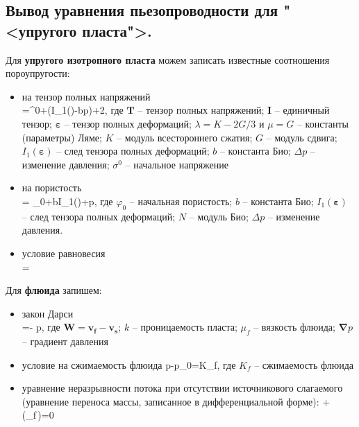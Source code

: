 

\subsection{Вывод уравнения пьезопроводности для "<упругого пласта">.}

Для \textbf{упругого изотропного пласта} можем записать известные соотношения пороупругости:
\begin{itemize}[parsep=-5pt]
\item на тензор полных напряжений \\
\beq
{}=\sigma^0+\left(\lambda I_1(\pmb{\varepsilon})-b\Delta p\right)+2\mu\pmb{\varepsilon},
\eeq
где $\pmb{T}$ -- тензор полных напряжений; $\pmb{I}$ -- единичный тензор; $\pmb{\varepsilon}$ -- тензор полных деформаций; $\lambda=K-2G/3$ и $\mu=G$ -- константы (параметры) Ляме; $K$ -- модуль всестороннего сжатия; $G$ -- модуль сдвига; $I_1(\pmb{\varepsilon})$ -- след тензора полных деформаций; $b$ -- константа Био; $\Delta p$ -- изменение давления; $\sigma^0$ -- начальное напряжение
\item на пористость \\
\beq
\varphi = \varphi_0+bI_1(\pmb{\varepsilon})+\Delta p,
\eeq
где $\varphi_0$ -- начальная пористость; $b$ -- константа Био; $I_1(\pmb{\varepsilon})$ -- след тензора полных деформаций; $N$ -- модуль Био; $\Delta p$ -- изменение давления.
\item условие равновесия \\
\beq
\pmb{\nabla}\cdot{}=
\eeq
\end{itemize}

Для \textbf{флюида} запишем:
\begin{itemize}[parsep=-5pt]
	\item закон Дарси \\
	\beq
	=-\cdot\pmb{\nabla} p,
	\eeq
	где $\pmb{W}=\pmb{v_f}-\pmb{v_s}$; $k$ -- проницаемость пласта; $\mu_f$ -- вязкость флюида; $\pmb{\nabla} p$ -- градиент давления
	\item условие на сжимаемость флюида
	\beq
	p-p_0=K_f,
	\eeq
	где $K_f$ -- сжимаемость флюида
	\item уравнение неразрывности потока при отсутствии источникового слагаемого (уравнение переноса массы, записанное в дифференциальной форме):
	\beq
	+\pmb{\nabla}\cdot\left(\rho_f\varphi\,\right)=0
	\eeq
\end{itemize}

